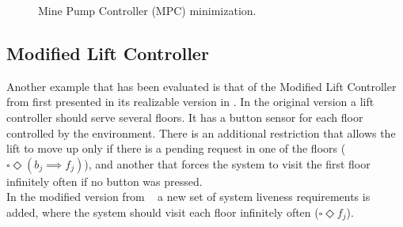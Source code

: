 \begin{figure}[bt]
\centering
\SmallPicture
{}
\vspace*{-2mm}
\caption{Mine Pump Controller (MPC) minimization.}
\label{fig:mine-pump-minimization}
\vspace*{-4mm}
\MediumPicture
\end{figure} 
\subsection{Modified Lift Controller}
Another example that has been evaluated is that
of the Modified Lift Controller from 
\cite{DBLP:conf/fmcad/AlurMT13} first presented in
its realizable version in 
\cite{DBLP:journals/jcss/BloemJPPS12}.
In the original version a lift controller should serve
several floors.  It has a button sensor for each floor 
controlled by the environment.  There is an additional 
restriction that allows the lift to move up only if there
is a pending request in one of the floors 
($\square \Diamond (b_j \implies f_j)$), and another that
forces the system to visit the first floor infinitely
often if no button was pressed.\\
In the modified version from ~\cite{DBLP:conf/fmcad/AlurMT13} a new set of system liveness 
requirements is added, where the system should 
visit each floor infinitely often ($\square \Diamond f_j$).


